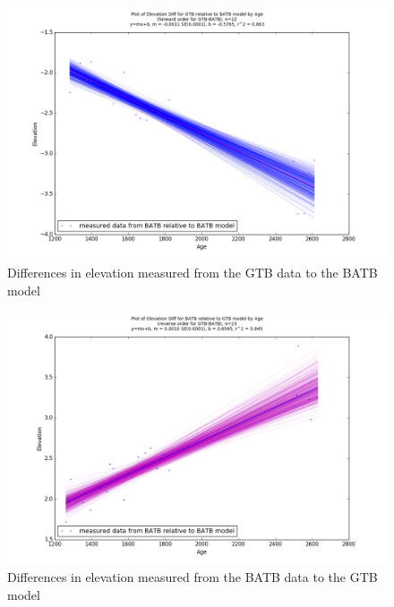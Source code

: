 \begin{figure}[h]
	\includegraphics[width=0.9\linewidth]{data/gias/theGIA_GTB_relative_to_BATB.png}
	\caption{Differences in elevation measured from the GTB data to the BATB model}
	\label{fig:gias_GTBxBATB}
\end{figure}
\newpage


\begin{figure}[h]
	\includegraphics[width=0.9\linewidth]{data/gias/theGIA_BATB_relative_to_GTB.png}
	\caption{Differences in elevation measured from the BATB data to the GTB model}
	\label{fig:gias_BATBxGTB}
\end{figure}
\newpage









